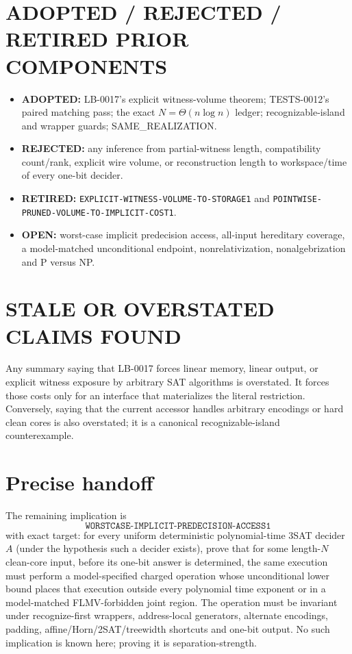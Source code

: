 \documentclass[11pt]{article}
\begin{document}
\section{ADOPTED / REJECTED / RETIRED PRIOR COMPONENTS}
\begin{itemize}[leftmargin=1.5em]
\item \textbf{ADOPTED:} LB-0017's explicit witness-volume theorem;
TESTS-0012's paired matching pass; the exact $N=\Theta(n\log n)$ ledger;
recognizable-island and wrapper guards; SAME\_REALIZATION.
\item \textbf{REJECTED:} any inference from partial-witness length,
compatibility count/rank, explicit wire volume, or reconstruction length to
workspace/time of every one-bit decider.
\item \textbf{RETIRED:} \texttt{EXPLICIT-WITNESS-VOLUME-TO-STORAGE1} and
\texttt{POINTWISE-PRUNED-VOLUME-TO-IMPLICIT-COST1}.
\item \textbf{OPEN:} worst-case implicit predecision access, all-input
hereditary coverage, a model-matched unconditional endpoint, nonrelativization,
nonalgebrization and P versus NP.
\end{itemize}

\section{STALE OR OVERSTATED CLAIMS FOUND}
Any summary saying that LB-0017 forces linear memory, linear output, or
explicit witness exposure by arbitrary SAT algorithms is overstated.  It
forces those costs only for an interface that materializes the literal
restriction.  Conversely, saying that the current accessor handles arbitrary
encodings or hard clean cores is also overstated; it is a canonical
recognizable-island counterexample.

\section{Precise handoff}
The remaining implication is
\[
 \boxed{\texttt{WORSTCASE-IMPLICIT-PREDECISION-ACCESS1}}
\]
with exact target: for every uniform deterministic polynomial-time 3SAT
decider $A$ (under the hypothesis such a decider exists), prove that for some
length-$N$ clean-core input, before its one-bit answer is determined, the
same execution must perform a model-specified charged operation whose
unconditional lower bound places that execution outside every polynomial
time exponent or in a model-matched FLMV-forbidden joint region.  The
operation must be invariant under recognize-first wrappers, address-local
generators, alternate encodings, padding, affine/Horn/2SAT/treewidth
shortcuts and one-bit output.  No such implication is known here; proving it
is separation-strength.
\end{document}
